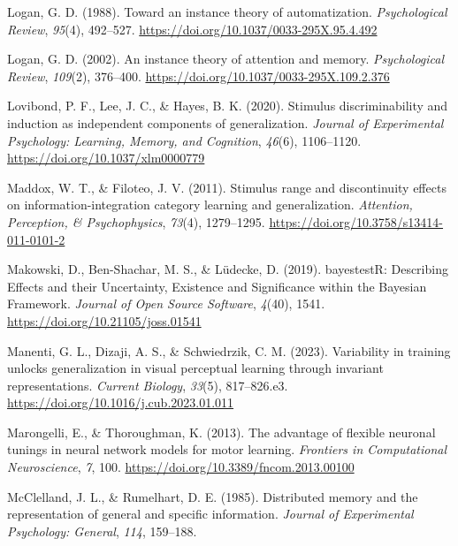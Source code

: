 \documentclass[
  11pt,
  letterpaper,
]{article}
\newlength{\cslhangindent}
\newenvironment{CSLReferences}[2] %
 {\begin{list}{}{%
  \setlength{\itemindent}{0pt}
  \setlength{\leftmargin}{0pt}
  \setlength{\parsep}{0pt}
  \ifodd #1
   \setlength{\leftmargin}{\cslhangindent}
   \setlength{\itemindent}{-1\cslhangindent}
  \fi
  \setlength{\itemsep}{#2\baselineskip}}}
 {\end{list}}
\begin{document}
\begin{CSLReferences}{1}{0}
Logan, G. D. (1988). Toward an instance theory of automatization.
\emph{Psychological Review}, \emph{95}(4), 492--527.
\url{https://doi.org/10.1037/0033-295X.95.4.492}

Logan, G. D. (2002). An instance theory of attention and memory.
\emph{Psychological Review}, \emph{109}(2), 376--400.
\url{https://doi.org/10.1037/0033-295X.109.2.376}

Lovibond, P. F., Lee, J. C., \& Hayes, B. K. (2020). Stimulus
discriminability and induction as independent components of
generalization. \emph{Journal of Experimental Psychology: Learning,
Memory, and Cognition}, \emph{46}(6), 1106--1120.
\url{https://doi.org/10.1037/xlm0000779}

Maddox, W. T., \& Filoteo, J. V. (2011). Stimulus range and
discontinuity effects on information-integration category learning and
generalization. \emph{Attention, Perception, \& Psychophysics},
\emph{73}(4), 1279--1295.
\url{https://doi.org/10.3758/s13414-011-0101-2}

Makowski, D., Ben-Shachar, M. S., \& Lüdecke, D. (2019). {bayestestR}:
{Describing Effects} and their {Uncertainty}, {Existence} and
{Significance} within the {Bayesian Framework}. \emph{Journal of Open
Source Software}, \emph{4}(40), 1541.
\url{https://doi.org/10.21105/joss.01541}

Manenti, G. L., Dizaji, A. S., \& Schwiedrzik, C. M. (2023). Variability
in training unlocks generalization in visual perceptual learning through
invariant representations. \emph{Current Biology}, \emph{33}(5),
817--826.e3. \url{https://doi.org/10.1016/j.cub.2023.01.011}

Marongelli, E., \& Thoroughman, K. (2013). The advantage of flexible
neuronal tunings in neural network models for motor learning.
\emph{Frontiers in Computational Neuroscience}, \emph{7}, 100.
\url{https://doi.org/10.3389/fncom.2013.00100}

McClelland, J. L., \& Rumelhart, D. E. (1985). Distributed memory and
the representation of general and specific information. \emph{Journal of
Experimental Psychology: General}, \emph{114}, 159--188.


\end{CSLReferences}
\end{document}
